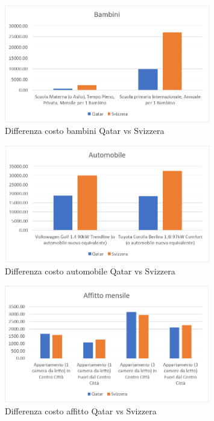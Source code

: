 \documentclass[a4paper, 12pt]{article}
\begin{document}
\pagebreak

\begin{figure}[h]
    \centering
    \includegraphics[width=0.8\textwidth]{images/bambini.png}
    \caption{Differenza costo bambini Qatar vs Svizzera}
\end{figure}

\begin{figure}[h]
    \centering
    \includegraphics[width=0.8\textwidth]{images/automobile.png}
    \caption{Differenza costo automobile Qatar vs Svizzera}
\end{figure}

\pagebreak

\begin{figure}[h]
    \centering
    \includegraphics[width=0.8\textwidth]{images/affitto.png}
    \caption{Differenza costo affitto Qatar vs Svizzera}
\end{figure}
\end{document}

